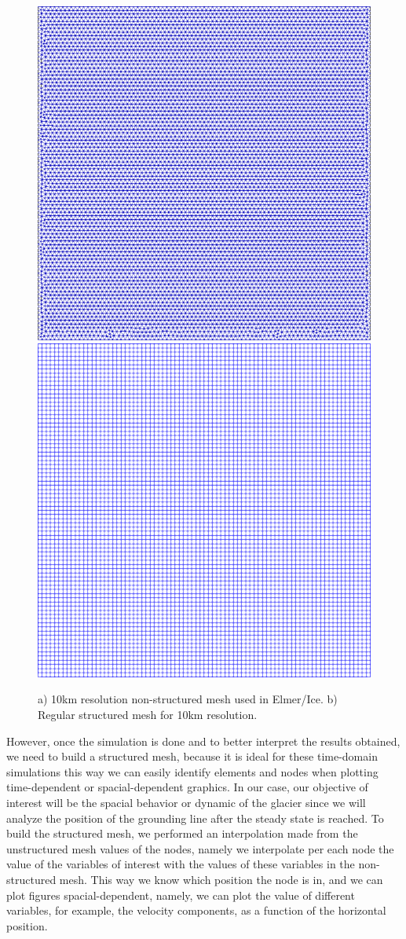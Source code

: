 \documentclass{article}
\begin{document}
	\begin{figure}[!h]
		\centering
		\includegraphics[width=0.45\linewidth]{../fig/non_structured_grid_10km.png}
            \includegraphics[width=0.45\linewidth]{../fig/regular_grid_10km.png}
		\caption{a) 10km resolution non-structured mesh used in Elmer/Ice. b) Regular structured mesh for 10km resolution.}
		\label{meshes}
	\end{figure}
 
 However, once the simulation is done and to better interpret the results obtained, we need to build a structured mesh, because it is ideal for these time-domain simulations this way we can  easily identify elements and nodes when plotting time-dependent or spacial-dependent graphics. In our case, our objective of interest will be the spacial behavior or dynamic of the glacier since we will analyze the position of the grounding line after the steady state is reached. To build the structured mesh, we performed an interpolation made from the unstructured mesh values of the nodes, namely we interpolate per each node the value of the variables of interest with the values of these variables in the non-structured mesh. This way we know which position the node is in, and we can plot figures spacial-dependent, namely, we can plot the value of different variables, for example, the velocity components, as a function of the horizontal position. 
 
\end{document}
